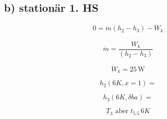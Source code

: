 \subsection*{b) stationär 1. HS}

\[
0 = \dot{m} (h_2 - h_3) - \dot{W}_k
\]

\[
\dot{m} = \frac{\dot{W}_k}{(h_2 - h_3)}
\]

\[
\dot{W}_k = 25 \, \text{W}
\]

\[
h_2 (6K, x = 1) =
\]

\[
h_3 (6K, \delta ba) =
\]

\[
T_3 \text{ aber } t_5.5 \, 6K
\]